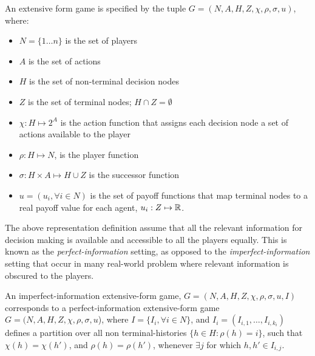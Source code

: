 \begin{definition}
	An extensive form game is specified by the tuple $G=(N, A, H, Z, \chi, \rho, \sigma, u)$, where:
	\begin{itemize}
		\item $N = \{1 \dots n \}$ is the set of players
		\item $A$ is the set of actions
		\item $H$ is the set of non-terminal decision nodes
		\item $Z$ is the set of terminal nodes; $H \cap Z = \emptyset$
		\item $\chi: H \mapsto 2^A$ is the action function that assigns each decision node a set of actions available to the player
		\item $\rho: H \mapsto N$, is the player function
		\item $\sigma: H \times A \mapsto H \cup Z$ is the successor function
		\item $u = (u_i,
			      \forall i \in N)$ is the set of payoff functions that map terminal nodes to a real payoff value
		      for each agent, $u_i: Z \mapsto \mathbb{R}$.
	\end{itemize}
\end{definition}

The above representation definition assume that all the relevant information for decision making is
available and accessible to all the players equally.
This is known as the \textit{perfect-information} setting, as opposed to the
\textit{imperfect-information} setting that occur in many real-world problem where relevant
information is obscured to the players.

\begin{definition}
	An imperfect-information extensive-form game, $G=(N, A, H, Z, \chi, \rho, \sigma, u, I)$ corresponds to a
	perfect-information extensive-form game $G=(N, A, H, Z, \chi, \rho, \sigma, u$), where
	$I = \{I_i, \forall i \in N\}$, and $I_i = (I_{i,1}, \dots, I_{i,k_i})$ defines a partition over all non terminal-histories
	$\{h \in H : \rho(h) = i\}$, such that
	$\chi(h) = \chi(h')$, and $\rho(h)=\rho(h')$, whenever $\exists j$ for which $h,h' \in I_{i,j}$.
\end{definition}

